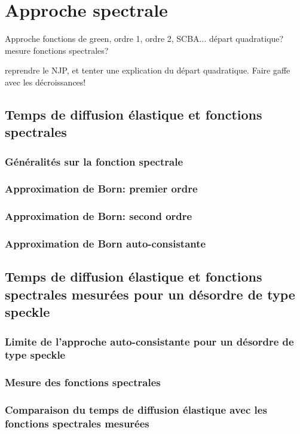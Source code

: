 \makeatletter
\def\toclevel@chapter{0}
\makeatother


\chapter{Approche spectrale}


Approche fonctions de green, ordre 1, ordre 2, SCBA...
départ quadratique?
mesure fonctions spectrales?

reprendre le NJP, et tenter une explication du départ quadratique. Faire gaffe avec les décroissances!


\section{Temps de diffusion élastique et fonctions spectrales}
\subsection{Généralités sur la fonction spectrale}
\subsection{Approximation de Born: premier ordre}
\subsection{Approximation de Born: second ordre}
\subsection{Approximation de Born auto-consistante}

\section{Temps de diffusion élastique et fonctions spectrales mesurées pour un désordre de type speckle}
\subsection{Limite de l'approche auto-consistante pour un désordre de type speckle}
\subsection{Mesure des fonctions spectrales}
\subsection{Comparaison du temps de diffusion élastique avec les fonctions spectrales mesurées}
